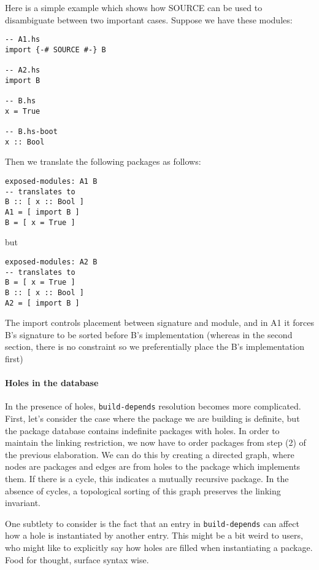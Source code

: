 \documentclass{article}
\begin{document}
Here is a simple example which shows how SOURCE can be used to disambiguate
between two important cases. Suppose we have these modules:

\begin{verbatim}
-- A1.hs
import {-# SOURCE #-} B

-- A2.hs
import B

-- B.hs
x = True

-- B.hs-boot
x :: Bool
\end{verbatim}

Then we translate the following packages as follows:

\begin{verbatim}
exposed-modules: A1 B
-- translates to
B :: [ x :: Bool ]
A1 = [ import B ]
B = [ x = True ]
\end{verbatim}

but

\begin{verbatim}
exposed-modules: A2 B
-- translates to
B = [ x = True ]
B :: [ x :: Bool ]
A2 = [ import B ]
\end{verbatim}

The import controls placement between signature and module, and in A1 it
forces B's signature to be sorted before B's implementation (whereas in
the second section, there is no constraint so we preferentially place
the B's implementation first)

\paragraph{Holes in the database} In the presence of holes,
\verb|build-depends| resolution becomes more complicated.  First,
let's consider the case where the package we are building is
definite, but the package database contains indefinite packages with holes.
In order to maintain the linking restriction, we now have to order packages
from step (2) of the previous elaboration.  We can do this by creating
a directed graph, where nodes are packages and edges are from holes to the
package which implements them.  If there is a cycle, this indicates a mutually
recursive package.  In the absence of cycles, a topological sorting of this
graph preserves the linking invariant.

One subtlety to consider is the fact that an entry in \verb|build-depends|
can affect how a hole is instantiated by another entry.  This might be a
bit weird to users, who might like to explicitly say how holes are
filled when instantiating a package.  Food for thought, surface syntax wise.
\end{document}
